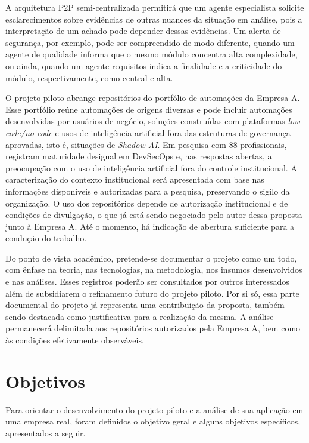 A arquitetura P2P semi-centralizada permitirá que um agente especialista solicite esclarecimentos sobre evidências de outras nuances da situação em análise, pois a interpretação de um achado pode depender dessas evidências. Um alerta de segurança, por exemplo, pode ser compreendido de modo diferente, quando um agente de qualidade informa que o mesmo módulo concentra alta complexidade, ou ainda, quando um agente requisitos indica a finalidade e a criticidade do módulo, respectivamente, como central e alta.

O projeto piloto abrange repositórios do portfólio de automações da Empresa A. Esse portfólio reúne automações de origens diversas e pode incluir automações desenvolvidas por usuários de negócio, soluções construídas com plataformas \textit{low-code/no-code} e usos de inteligência artificial fora das estruturas de governança aprovadas, isto é, situações de \textit{Shadow AI}. Em pesquisa com 88 profissionais,  registram maturidade desigual em DevSecOps e, nas respostas abertas, a preocupação com o uso de inteligência artificial fora do controle institucional. A caracterização do contexto institucional será apresentada com base nas informações disponíveis e autorizadas para a pesquisa, preservando o sigilo da organização. O uso dos repositórios depende de autorização institucional e de condições de divulgação, o que já está sendo negociado pelo autor dessa proposta junto à Empresa A. Até o momento, há indicação de abertura suficiente para a condução do trabalho.

Do ponto de vista acadêmico, pretende-se documentar o projeto como um todo, com ênfase na teoria, nas tecnologias, na metodologia, nos insumos desenvolvidos e nas análises. Esses registros poderão ser consultados por outros interessados além de subsidiarem o refinamento futuro do projeto piloto. Por si só, essa parte documental do projeto já representa uma contribuição da proposta, também sendo destacada como justificativa para a realização da mesma. A análise permanecerá delimitada aos repositórios autorizados pela Empresa A, bem como às condições efetivamente observáveis.

\section{Objetivos}
\label{1-objetivos}

Para orientar o desenvolvimento do projeto piloto e a análise de sua aplicação em uma empresa real, foram definidos o objetivo geral e alguns objetivos específicos, apresentados a seguir.

